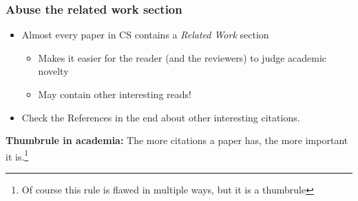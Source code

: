 \documentclass[xcolor={usenames,dvipsnames}]{beamer}
\begin{document}
\begin{frame}
	\frametitle{Abuse the related work section}

	\begin{itemize}
		\item Almost every paper in CS contains a \emph{Related Work} section
			\begin{itemize}
			\item Makes it easier for the reader (and the reviewers) to judge academic novelty
			\item May contain \alert{other} interesting reads!
			\end{itemize}
		\item Check the References in the end about other interesting citations.
	\end{itemize}

	\vspace{1cm}

	\textbf{Thumbrule in academia:} The more citations a paper has, the more important it is.\footnote{Of course this rule is flawed in multiple ways, but it is a thumbrule}
\end{frame}
\end{document}
